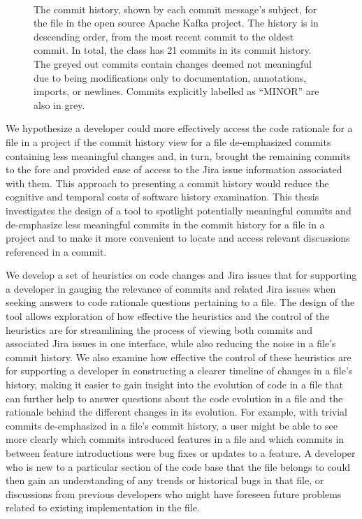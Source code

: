 \begin{figure}
\begin{RaggedRight}
	 \\
	\caption{The commit history, shown by each commit message's subject, for the  file in the open source Apache Kafka project. 		The history is in descending order, from the most recent commit to the oldest commit.
		In total, the  class has 21 commits in its commit history. The greyed out commits contain changes deemed not meaningful due 		to being modifications only to documentation, annotations, imports, or newlines. Commits explicitly labelled as ``MINOR'' are also in grey.}
	\label{fig:Topology-Commit-History}
\end{RaggedRight}
\end{figure}

We hypothesize a developer could more effectively access the code rationale for a file in a project if the commit history view for a file de-emphasized commits containing less meaningful changes and, in turn, brought the remaining commits to the fore and provided ease of access to the Jira issue information associated with them.
This approach to presenting a commit history would reduce the cognitive and temporal costs of software history examination. %
This thesis investigates the design of a tool to spotlight potentially meaningful commits and de-emphasize less meaningful commits in the commit history for a file in a project and to make it more convenient to locate and access relevant discussions referenced in a commit. 

We develop a set of heuristics on code changes and Jira issues that for supporting a developer in gauging the relevance of commits and related Jira issues when seeking answers to code rationale questions pertaining to a file.
The design of the tool allows exploration of how effective the heuristics and the control of the heuristics are for streamlining the process of viewing both commits and associated Jira issues in one interface, while also reducing the noise in a file's commit history.
We also examine how effective the control of these heuristics are for supporting a developer in constructing a clearer timeline of changes in a file's history, making it easier to gain insight into the evolution of code in a file that can further help to answer questions about the code evolution in a file and the rationale behind the different changes in its evolution. 
For example, with trivial commits de-emphasized in a file's commit history, a user might be able to see more clearly which commits introduced features in a file and which commits in between feature introductions were bug fixes or updates to a feature.
A developer who is new to a particular section of the code base that the file belongs to could then gain an understanding of any trends or historical bugs in that file, or discussions from previous developers who might have foreseen future problems related to existing implementation in the file.

